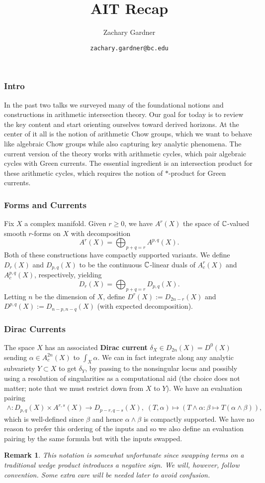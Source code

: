 \documentclass[11pt]{beamer}
\newtheorem{remark}{Remark}
\begin{document}
\title{AIT Recap}
\author{Zachary Gardner}
\date{\texttt{zachary.gardner@bc.edu}}
\maketitle

\begin{frame}
\frametitle{Intro}
In the past two talks we surveyed many of the foundational notions and constructions in arithmetic intersection theory. Our goal for today is to review the key content and start orienting ourselves toward derived horizons. At the center of it all is the notion of arithmetic Chow groups, which we want to behave like algebraic Chow groups while also capturing key analytic phenomena. The current version of the theory works with arithmetic cycles, which pair algebraic cycles with Green currents. The essential ingredient is an intersection product for these arithmetic cycles, which requires the notion of $*$-product for Green currents. 
\end{frame}

\begin{frame}
\frametitle{Forms and Currents}
Fix $X$ a complex manifold. Given $r\geq0$, we have $A^r(X)$ the space of $\mathbb{C}$-valued smooth $r$-forms on $X$ with decomposition 
$$A^r(X)=\bigoplus_{p+q=r}A^{p,q}(X).$$ 
Both of these constructions have compactly supported variants. We define $D_r(X)$ and $D_{p,q}(X)$ to be the continuous $\mathbb{C}$-linear duals of $A_c^r(X)$ and $A_c^{p,q}(X)$, respectively, yielding 
$$D_r(X)=\bigoplus_{p+q=r}D_{p,q}(X).$$ 
Letting $n$ be the dimension of $X$, define $D^r(X):=D_{2n-r}(X)$ and $D^{p,q}(X):=D_{n-p,n-q}(X)$ (with expected decomposition).
\end{frame}

\begin{frame}
\frametitle{Dirac Currents}
The space $X$ has an associated \textbf{Dirac current} $\delta_X\in D_{2n}(X)=D^0(X)$ sending $\alpha\in A_c^{2n}(X)$ to $\int_X\alpha$. We can in fact integrate along any analytic subvariety $Y\subset X$ to get $\delta_Y$, by passing to the nonsingular locus and possibly using a resolution of singularities as a computational aid (the choice does not matter; note that we must restrict down from $X$ to $Y$). We have an evaluation pairing
\begin{align*}
\wedge: D_{p,q}(X)\times A^{r,s}(X)\to D_{p-r,q-s}(X),\;(T,\alpha)\mapsto(T\wedge\alpha: \beta\mapsto T(\alpha\wedge\beta)),
\end{align*}
which is well-defined since $\beta$ and hence $\alpha\wedge\beta$ is compactly supported. We have no reason to prefer this ordering of the inputs and so we also define an evaluation pairing by the same formula but with the inputs swapped. 

\begin{remark}
This notation is somewhat unfortunate since swapping terms on a traditional wedge product introduces a negative sign. We will, however, follow convention. Some extra care will be needed later to avoid confusion.
\end{remark}
\end{frame}
\end{document}

